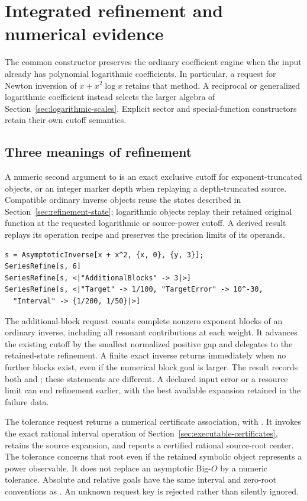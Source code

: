 \section{Integrated refinement and numerical evidence}
\label{sec:integrated-requests}

The common constructor preserves the ordinary coefficient engine when the
input already has polynomial logarithmic coefficients. In particular, a
request for Newton inversion of $x+x^2\log x$ retains that method. A
reciprocal or generalized logarithmic coefficient instead selects the
larger algebra of Section~\ref{sec:logarithmic-scales}. Explicit sector and
special-function constructors retain their own cutoff semantics.

\subsection{Three meanings of refinement}

A numeric second argument to  is an exact exclusive
cutoff for exponent-truncated objects, or an integer marker depth when
replaying a depth-truncated source. Compatible ordinary inverse objects reuse the states described in
Section~\ref{sec:refinement-state}; logarithmic objects replay their
retained original function at the requested logarithmic or source-power
cutoff. A derived result replays its operation recipe and preserves the
precision limits of its operands.

\begin{lstlisting}
s = AsymptoticInverse[x + x^2, {x, 0}, {y, 3}];
SeriesRefine[s, 6]
SeriesRefine[s, <|"AdditionalBlocks" -> 3|>]
SeriesRefine[s, <|"Target" -> 1/100, "TargetError" -> 10^-30,
  "Interval" -> {1/200, 1/50}|>]
\end{lstlisting}

The additional-block request counts complete nonzero exponent blocks of
an ordinary inverse, including all resonant contributions at each weight.
It advances the existing cutoff by the smallest normalized positive gap
and delegates to the retained-state refinement. A finite exact inverse
returns immediately when no further blocks exist, even if the numerical
block goal is larger. The result records both  and
; these statements are different. A declared
input error or a resource limit can end refinement earlier, with the best
available expansion retained in the failure data.

The tolerance request returns a numerical certificate association, with
. It invokes the exact
rational interval operation of Section~\ref{sec:executable-certificates}, retains
the source expansion, and reports a certified rational source-root center.
The tolerance concerns that root even if the retained symbolic object
represents a power observable. It does
not replace an asymptotic Big-$O$ by a numeric tolerance. Absolute and
relative goals have the same interval and zero-root conventions as
. An unknown request key is rejected rather than
silently ignored.

